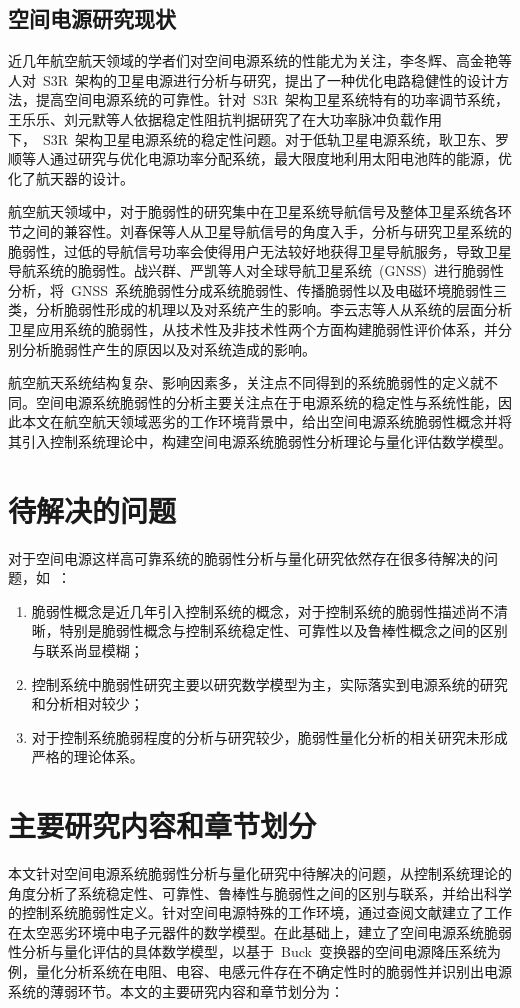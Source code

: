 \subsection{空间电源研究现状}%
近几年航空航天领域的学者们对空间电源系统的性能尤为关注，李冬辉、高金艳等人对~S3R~架构的卫星电源进行分析与研究，提出了一种优化电路稳健性的设计方法，提高空间电源系统的可靠性\cite{Li2015,Gao2014master}。针对~S3R~架构卫星系统特有的功率调节系统，王乐乐、刘元默等人依据稳定性阻抗判据研究了在大功率脉冲负载作用下，~S3R~架构卫星电源系统的稳定性问题\cite{Wang2014}。对于低轨卫星电源系统，耿卫东、罗顺等人通过研究与优化电源功率分配系统，最大限度地利用太阳电池阵的能源，优化了航天器的设计\cite{Luo2011master}。

航空航天领域中，对于脆弱性的研究集中在卫星系统导航信号及整体卫星系统各环节之间的兼容性。刘春保等人从卫星导航信号的角度入手，分析与研究卫星系统的脆弱性\cite{Liu2015}，过低的导航信号功率会使得用户无法较好地获得卫星导航服务，导致卫星导航系统的脆弱性。战兴群、严凯等人对全球导航卫星系统~(GNSS)~进行脆弱性分析\cite{Yan2013}，将~GNSS~系统脆弱性分成系统脆弱性、传播脆弱性以及电磁环境脆弱性三类，分析脆弱性形成的机理以及对系统产生的影响。李云志等人从系统的层面分析卫星应用系统的脆弱性\cite{Li2015phd}，从技术性及非技术性两个方面构建脆弱性评价体系，并分别分析脆弱性产生的原因以及对系统造成的影响。

航空航天系统结构复杂、影响因素多，关注点不同得到的系统脆弱性的定义就不同。空间电源系统脆弱性的分析主要关注点在于电源系统的稳定性与系统性能，因此本文在航空航天领域恶劣的工作环境背景中，给出空间电源系统脆弱性概念并将其引入控制系统理论中，构建空间电源系统脆弱性分析理论与量化评估数学模型。
\section{待解决的问题}
\label{sec:chap1:Todolist}
对于空间电源这样高可靠系统的脆弱性分析与量化研究依然存在很多待解决的问题，如~：
\begin{enumerate}[(1)]
  \item 脆弱性概念是近几年引入控制系统的概念，对于控制系统的脆弱性描述尚不清晰，特别是脆弱性概念与控制系统稳定性、可靠性以及鲁棒性概念之间的区别与联系尚显模糊；
  \item 控制系统中脆弱性研究主要以研究数学模型为主，实际落实到电源系统的研究和分析相对较少；
  \item 对于控制系统脆弱程度的分析与研究较少，脆弱性量化分析的相关研究未形成严格的理论体系。
 \end{enumerate}
\section{主要研究内容和章节划分}
\label{sec:chap1:content}
本文针对空间电源系统脆弱性分析与量化研究中待解决的问题，从控制系统理论的角度分析了系统稳定性、可靠性、鲁棒性与脆弱性之间的区别与联系，并给出科学的控制系统脆弱性定义。针对空间电源特殊的工作环境，通过查阅文献建立了工作在太空恶劣环境中电子元器件的数学模型。在此基础上，建立了空间电源系统脆弱性分析与量化评估的具体数学模型，以基于~Buck~变换器的空间电源降压系统为例，量化分析系统在电阻、电容、电感元件存在不确定性时的脆弱性并识别出电源系统的薄弱环节。本文的主要研究内容和章节划分为：


